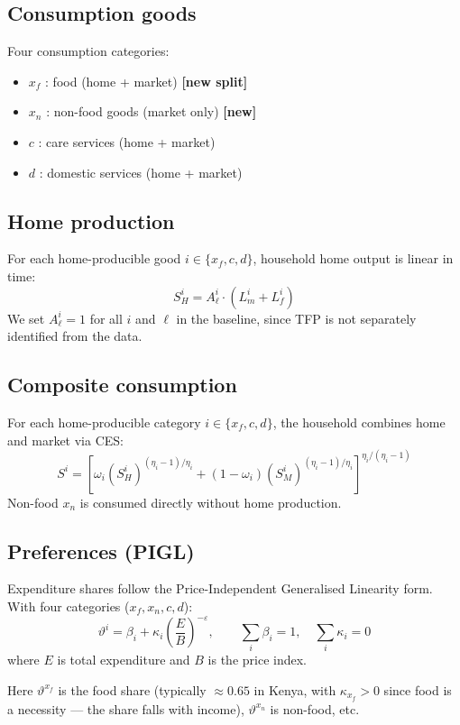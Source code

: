 \documentclass[11pt,a4paper]{article}
\begin{document}
\subsection{Consumption goods}

Four consumption categories:
\begin{itemize}[noitemsep]
  \item $x_f$ : food (home + market) \textbf{[new split]}
  \item $x_n$ : non-food goods (market only) \textbf{[new]}
  \item $c$ : care services (home + market)
  \item $d$ : domestic services (home + market)
\end{itemize}

\subsection{Home production}

For each home-producible good $i \in \{x_f, c, d\}$, household home
output is linear in time:
\[
  S^i_H = A^i_\ell \cdot \left( L^i_m + L^i_f \right)
\]
We set $A^i_\ell = 1$ for all $i$ and $\ell$ in the baseline, since
TFP is not separately identified from the data.

\subsection{Composite consumption}

For each home-producible category $i \in \{x_f, c, d\}$, the household
combines home and market via CES:
\[
  S^i = \left[ \omega_i (S^i_H)^{(\eta_i - 1)/\eta_i}
             + (1-\omega_i)(S^i_M)^{(\eta_i - 1)/\eta_i} \right]^{\eta_i / (\eta_i - 1)}
\]
Non-food $x_n$ is consumed directly without home production.

\subsection{Preferences (PIGL)}

Expenditure shares follow the Price-Independent Generalised Linearity
form. With four categories ($x_f, x_n, c, d$):
\[
  \vartheta^i = \beta_i + \kappa_i \left( \frac{E}{B} \right)^{-\varepsilon},
  \qquad \sum_i \beta_i = 1, \quad \sum_i \kappa_i = 0
\]
where $E$ is total expenditure and $B$ is the price index.

Here $\vartheta^{x_f}$ is the food share (typically $\approx 0.65$ in
Kenya, with $\kappa_{x_f} > 0$ since food is a necessity --- the share
falls with income), $\vartheta^{x_n}$ is non-food, etc.
\end{document}
